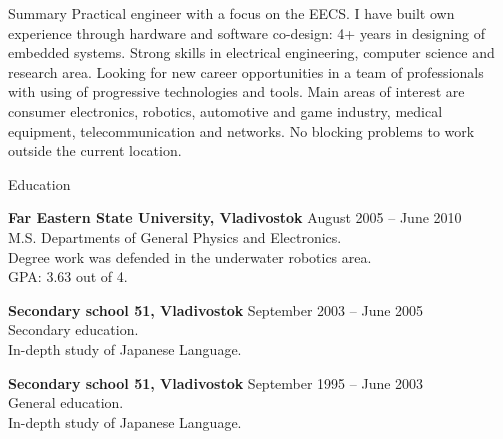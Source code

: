 \documentclass{template}
\begin{document}

\begin{rSection}{Summary}
Practical engineer with a focus on the EECS. I have built own experience through hardware and software co-design: 4+ years in designing of embedded systems. Strong skills in electrical engineering, computer science and research area. Looking for new career opportunities in a team of professionals with using of progressive technologies and tools. Main areas of interest are consumer electronics, robotics, automotive and game industry, medical equipment, telecommunication and networks. No blocking problems to work outside the current location.
\end{rSection}


\begin{rSection}{Education}

{\bf Far Eastern State University, Vladivostok} \hfill {August 2005 -- June 2010} \\
M.S. Departments of General Physics and Electronics. \\
Degree work was defended in the underwater robotics area. \\
GPA: 3.63 out of 4.

{\bf Secondary school 51, Vladivostok} \hfill {September 2003 -- June 2005} \\
Secondary education. \\
In-depth study of Japanese Language.

{\bf Secondary school 51, Vladivostok} \hfill {September 1995 -- June 2003} \\
General education. \\
In-depth study of Japanese Language.

\end{rSection}

\end{document}
